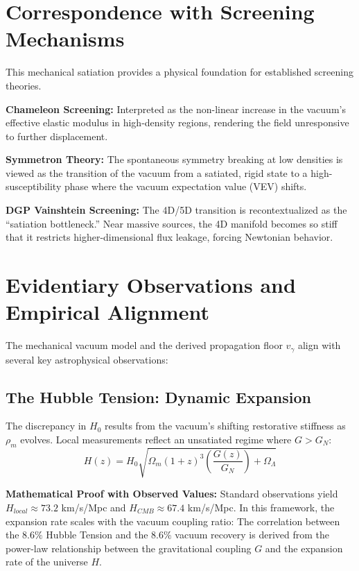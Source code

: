 \documentclass[12pt,a4paper]{article}
\begin{document}
\section{Correspondence with Screening Mechanisms}
This mechanical satiation provides a physical foundation for established screening theories.

\textbf{Chameleon Screening:} Interpreted as the non-linear increase in the vacuum's effective elastic modulus in high-density regions, rendering the field unresponsive to further displacement.

\textbf{Symmetron Theory:} The spontaneous symmetry breaking at low densities is viewed as the transition of the vacuum from a satiated, rigid state to a high-susceptibility phase where the vacuum expectation value (VEV) shifts.

\textbf{DGP Vainshtein Screening:} The 4D/5D transition is recontextualized as the ``satiation bottleneck.'' Near massive sources, the 4D manifold becomes so stiff that it restricts higher-dimensional flux leakage, forcing Newtonian behavior.

\section{Evidentiary Observations and \\ Empirical Alignment}
The mechanical vacuum model and the derived propagation floor $v_{\gamma}$ align with several key astrophysical observations:

\subsection{The Hubble Tension: Dynamic Expansion}
The discrepancy in $H_0$ results from the vacuum's shifting restorative stiffness as $\rho_m$ evolves. Local measurements reflect an unsatiated regime where $G > G_N$:
\begin{equation}
H(z) = H_{0} \sqrt{\Omega_m (1+z)^3 \left( \frac{G(z)}{G_N} \right) + \Omega_\Lambda}
\end{equation}

{\sloppy
\textbf{Mathematical Proof with Observed Values:}
Standard observations yield $H_{local} \approx 73.2$ km/s/Mpc and $H_{CMB} \approx 67.4$ km/s/Mpc. In this framework, the expansion rate scales with the vacuum coupling ratio:
The correlation between the $8.6\%$ Hubble Tension and the $8.6\%$ vacuum recovery is derived from the power-law relationship between the gravitational coupling $G$ and the expansion rate of the universe $H$. \par}
\end{document}
